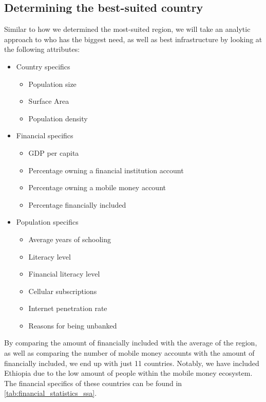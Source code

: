 \documentclass[11pt, a4paper]{article}
\begin{document}
\subsection{Determining the best-suited country} %
\label{sub:determining_the_best_suited_country}
Similar to how we determined the most-suited region, we will take an analytic approach to who has the biggest need, as well as best infrastructure by looking at the following attributes:

\begin{itemize}
  \item Country specifics
  \begin{itemize}
    \item Population size
    \item Surface Area
    \item Population density
  \end{itemize}
  \item Financial specifics
  \begin{itemize}
    \item GDP per capita
    \item Percentage owning a financial institution account
    \item Percentage owning a mobile money account
    \item Percentage financially included
  \end{itemize}
  \item Population specifics
  \begin{itemize}
    \item Average years of schooling
    \item Literacy level
    \item Financial literacy level
    \item Cellular subscriptions
    \item Internet penetration rate
    \item Reasons for being unbanked
  \end{itemize}
\end{itemize}
By comparing the amount of financially included with the average of the region, as well as comparing the number of mobile money accounts with the amount of financially included, we end up with just 11 countries. Notably, we have included Ethiopia due to the low amount of people within the mobile money ecosystem. The financial specifics of these countries can be found in \autoref{tab:financial_statistics_ssa}.
\end{document}
